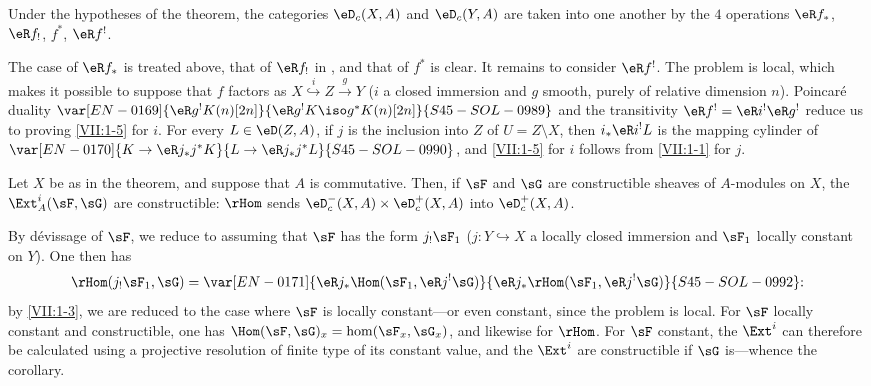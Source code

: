 \begin{corollary_}\label{VII:1-5}
Under the hypotheses of the theorem, the categories $\eD_c(X,A)$ and
$\eD_c(Y,A)$ are taken into one another by the $4$ operations
$\eR f_\ast$, $\eR f_!$, $f^\ast$, $\eR f^!$.
\end{corollary_}

The case of $\eR f_\ast$ is treated above, that of $\eR f_!$ in
, and that of $f^\ast$ is clear. It remains to consider
$\eR f^!$. The problem is local, which makes it possible to suppose that $f$
factors as $X\overset{i}{\hookrightarrow} Z \xrightarrow g Y$ ($i$ a closed immersion and
$g$ smooth, purely of relative dimension $n$). Poincaré duality
$\var[EN-0169]{\eR g^! K(n)[2 n]}{\eR g^! K \iso g^\ast K(n)[2 n]}{S45-SOL-0989}$ and the transitivity
$\eR f^! = \eR i^! \eR g^!$ reduce us to proving \ref{VII:1-5} for $i$.
For every $L\in \eD(Z,A)$, if $j$ is the inclusion into $Z$ of
$U=Z\setminus X$, then $i_\ast \eR i^! L$ is the mapping cylinder of
$\var[EN-0170]{K\to \eR j_\ast j^\ast K}{L\to \eR j_\ast j^\ast L}{S45-SOL-0990}$, and \ref{VII:1-5} for $i$ follows from
\ref{VII:1-1} for $j$.






\begin{corollary_}\label{VII:1-6}
Let $X$ be as in the theorem, and suppose that $A$ is commutative. Then, if
$\sF$ and $\sG$ are constructible sheaves of $A$-modules on $X$, the
$\Ext_A^i(\sF,\sG)$ are constructible: $\rHom$ sends
$\eD_c^-(X,A)\times \eD_c^+(X,A)$ into $\eD_c^+(X,A)$.
\end{corollary_}

By dévissage of $\sF$, we reduce to assuming that $\sF$ has the form
$j_!\sF_1$ ($j:Y\hookrightarrow X$ a locally closed immersion and $\sF_1$
locally constant on $Y$). One then has
\[
  \rHom(j_! \sF_1,\sG) = \var[EN-0171]{\eR j_\ast \Hom(\sF_1,\eR j^! \sG)}{\eR j_\ast \rHom(\sF_1,\eR j^! \sG)}{S45-SOL-0992} \text{:}
\]
by \ref{VII:1-3}, we are reduced to the case where $\sF$ is locally
constant---or even constant, since the problem is local. For $\sF$ locally
constant and constructible, one has
$\Hom(\sF,\sG)_x=\hom(\sF_x,\sG_x)$, and likewise for $\rHom$. For $\sF$
constant, the $\Ext^i$ can therefore be calculated using a projective
resolution of finite type of its constant value, and the $\Ext^i$ are
constructible if $\sG$ is---whence the corollary.






